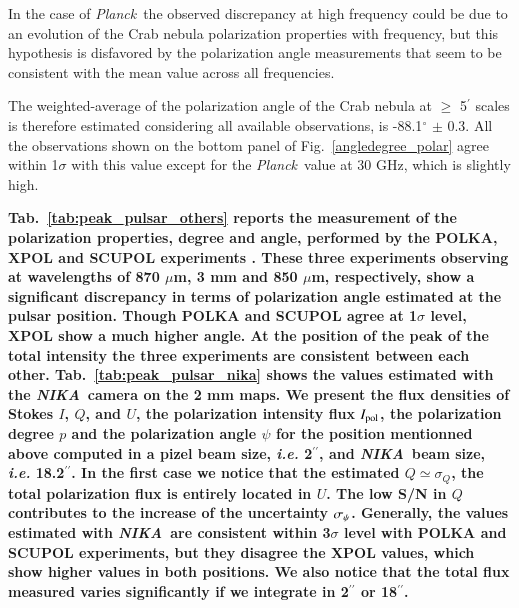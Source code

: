 \documentclass[twocolumn,traditabstract]{aa}
\def\NIKA{\textit{NIKA}}
\def\Planck{\textit{Planck}}
\begin{document}
In the case of \Planck\, the observed discrepancy at high frequency could be due
to an evolution of the Crab nebula polarization properties with frequency, but
this hypothesis is disfavored by the polarization angle measurements that seem
to be consistent with the mean value across all frequencies.

The weighted-average of the polarization angle of the Crab nebula at $\geq$ 5$^{\prime}$ scales is therefore estimated considering all available observations, is -88.1$^{\circ}$
$\pm$ 0.3.  All the observations shown on the bottom panel of
Fig.~\ref{angledegree_polar} agree within 1$\sigma$ with this value except for
the \Planck\ value at 30 GHz, which is slightly high.

\textbf{Tab.~\ref{tab:peak_pulsar_others} reports the measurement of the polarization properties, degree and angle, performed by the POLKA, XPOL and SCUPOL experiments \cite{2014PASP..126.1027W}.
These three experiments observing at wavelengths of 870 $\mu$m, 3 mm and 850 $\mu$m, respectively, show a significant discrepancy in terms of polarization angle estimated at the pulsar position.
Though POLKA and SCUPOL agree at 1$\sigma$ level, XPOL show a much higher angle. At the position of the peak of the total intensity the three experiments are consistent between each other.
Tab.~\ref{tab:peak_pulsar_nika} shows the values estimated with the \NIKA\ camera on the 2 mm maps. We present the flux densities of Stokes $I$, $Q$, and $U$, the polarization intensity flux $I_{\rm pol}$,
the polarization degree $p$ and the polarization angle $\psi$ for the position mentionned above computed in a pizel beam size, {\it i.e.} 2$^{\prime\prime}$, and \NIKA\ beam size, {\it i.e.} 18.2$^{\prime\prime}$.
In the first case we notice that the estimated $Q\simeq\sigma_Q$, the total polarization flux is entirely located in $U$. The low S/N in $Q$ contributes to the increase of the uncertainty $\sigma_{ \rm\psi}$. 
Generally, the values estimated with \NIKA\ are consistent within 3$\sigma$ level with POLKA and SCUPOL experiments, but they disagree the XPOL values, which show higher values in both positions. We also notice that the total flux measured varies significantly if we integrate in 2$^{\prime\prime}$ or 18$^{\prime\prime}$.}
\end{document}
